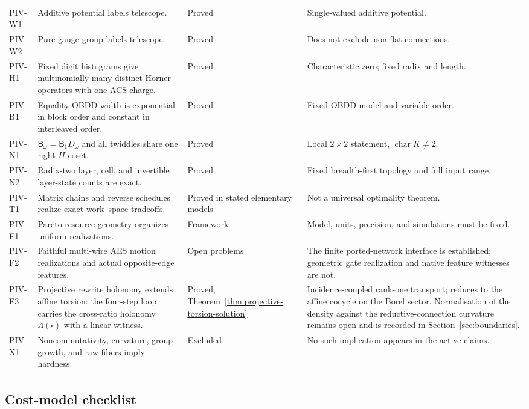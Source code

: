 \begin{longtable}{L{0.10\textwidth}L{0.36\textwidth}L{0.13\textwidth}L{0.24\textwidth}}
PIV-W1 & Additive potential labels telescope. & Proved & Single-valued additive potential.\\
PIV-W2 & Pure-gauge group labels telescope. & Proved & Does not exclude non-flat connections.\\
PIV-H1 & Fixed digit histograms give multinomially many distinct Horner operators with one ACS charge. & Proved & Characteristic zero; fixed radix and length.\\
PIV-B1 & Equality OBDD width is exponential in block order and constant in interleaved order. & Proved & Fixed OBDD model and variable order.\\
PIV-N1 & $\mathsf B_\omega=\mathsf B_1D_\omega$ and all twiddles share one right $H$-coset. & Proved & Local $2\times2$ statement, $\operatorname{char}K\ne2$.\\
PIV-N2 & Radix-two layer, cell, and invertible layer-state counts are exact. & Proved & Fixed breadth-first topology and full input range.\\
PIV-T1 & Matrix chains and reverse schedules realize exact work--space tradeoffs. & Proved in stated elementary models & Not a universal optimality theorem.\\
PIV-F1 & Pareto resource geometry organizes uniform realizations. & Framework & Model, units, precision, and simulations must be fixed.\\
PIV-F2 & Faithful multi-wire AES motion realizations and actual opposite-edge features. & Open problems & The finite ported-network interface is established; geometric gate realization and native feature witnesses are not.\\
PIV-F3 & Projective rewrite holonomy extends affine torsion: the four-step loop carries the cross-ratio holonomy $\Lambda(\square)$ with a linear witness. & Proved, Theorem~\ref{thm:projective-torsion-solution} & Incidence-coupled rank-one transport; reduces to the affine cocycle on the Borel sector. Normalisation of the density against the reductive-connection curvature remains open and is recorded in Section~\ref{sec:boundaries}.\\
PIV-X1 & Noncommutativity, curvature, group growth, and raw fibers imply hardness. & Excluded & No such implication appears in the active claims.\\
\bottomrule
\end{longtable}
\endgroup

\subsection{Cost-model checklist}

